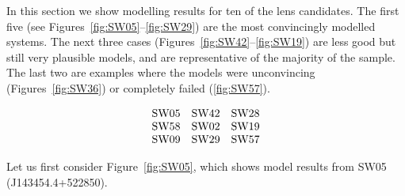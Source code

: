\documentclass[fleqn,usenatbib]{mnras}
\newcommand{\figref}[1]{\ref{fig:#1}}
\begin{document}
In this section we show modelling results for ten of the lens
candidates.  The first five (see Figures~\figref{SW05}--\figref{SW29})
are the most convincingly modelled systems.  The next three cases
(Figures~\figref{SW42}--\figref{SW19}) are less good but still very
plausible models, and are representative of the majority of the
sample.  The last two are examples where the models were unconvincing
(Figures~\figref{SW36}) or completely failed (\figref{SW57}).

$$
\begin{matrix}
\rm SW05  &\rm SW42  &\rm SW28 \\
\rm SW58  &\rm SW02  &\rm SW19 \\
\rm SW09  &\rm SW29  &\rm SW57
\end{matrix}
$$


Let us first consider Figure~\figref{SW05}, which shows model results
from SW05 (J143454.4+522850).
\end{document}
